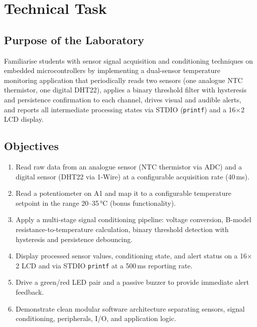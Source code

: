\documentclass[12pt]{article}
\begin{document}
\setcounter{page}{2}
\pagestyle{fancy}
\fancyhf{}
\rhead{\thepage}

\section*{Technical Task}

\subsection*{Purpose of the Laboratory}
\hspace{0.8cm} Familiarise students with sensor signal acquisition and conditioning techniques on embedded microcontrollers by implementing a dual-sensor temperature monitoring application that periodically reads two sensors (one analogue NTC thermistor, one digital DHT22), applies a binary threshold filter with hysteresis and persistence confirmation to each channel, drives visual and audible alerts, and reports all intermediate processing states via STDIO (\texttt{printf}) and a 16$\times$2 LCD display.

\subsection*{Objectives}
\begin{enumerate}
    \item Read raw data from an analogue sensor (NTC thermistor via ADC) and a digital sensor (DHT22 via 1-Wire) at a configurable acquisition rate (40\,ms).
    \item Read a potentiometer on A1 and map it to a configurable temperature setpoint in the range 20--35\,°C (bonus functionality).
    \item Apply a multi-stage signal conditioning pipeline: voltage conversion, B-model resistance-to-temperature calculation, binary threshold detection with hysteresis and persistence debouncing.
    \item Display processed sensor values, conditioning state, and alert status on a 16$\times$2 LCD and via STDIO \texttt{printf} at a 500\,ms reporting rate.
    \item Drive a green/red LED pair and a passive buzzer to provide immediate alert feedback.
    \item Demonstrate clean modular software architecture separating sensors, signal conditioning, peripherals, I/O, and application logic.
\end{enumerate}
\end{document}
